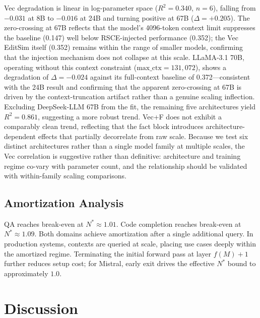 \documentclass[11pt]{article}
\begin{document}
Vec degradation is linear in log-parameter space ($R^2 = 0.340$, $n=6$), falling from $-0.031$ at 8B to $-0.016$ at 24B and turning positive at 67B ($\Delta = +0.205$). The zero-crossing at 67B reflects that the model's 4096-token context limit suppresses the baseline (0.147) well below RSCE-injected performance (0.352); the Vec EditSim itself (0.352) remains within the range of smaller models, confirming that the injection mechanism does not collapse at this scale. LLaMA-3.1 70B, operating without this context constraint ($\text{max\_ctx} = 131{,}072$), shows a degradation of $\Delta = -0.024$ against its full-context baseline of 0.372---consistent with the 24B result and confirming that the apparent zero-crossing at 67B is driven by the context-truncation artifact rather than a genuine scaling inflection. Excluding DeepSeek-LLM 67B from the fit, the remaining five architectures yield $R^2 = 0.861$, suggesting a more robust trend. Vec+F does not exhibit a comparably clean trend, reflecting that the fact block introduces architecture-dependent effects that partially decorrelate from raw scale. Because we test six distinct architectures rather than a single model family at multiple scales, the Vec correlation is suggestive rather than definitive: architecture and training regime co-vary with parameter count, and the relationship should be validated with within-family scaling comparisons.

\subsection{Amortization Analysis}
QA reaches break-even at $N^* \approx 1.01$. Code completion reaches break-even at $N^* \approx 1.09$. Both domains achieve amortization after a single additional query. In production systems, contexts are queried at scale, placing use cases deeply within the amortized regime. Terminating the initial forward pass at layer $f(M)+1$ further reduces setup cost; for Mistral, early exit drives the effective $N^*$ bound to approximately $1.0$.

\section{Discussion}
\label{sec:discussion}
\end{document}
